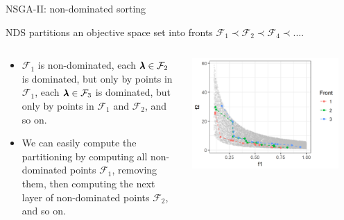 \begin{frame}[allowframebreaks]{NSGA-II: non-dominated sorting}



NDS partitions an objective space set into fronts $\mathcal{F}_1 \prec \mathcal{F}_2 \prec \mathcal{F}_4 \prec ... $.

\begin{columns}
\begin{column}{0.4\textwidth}
\begin{itemize}
    \item $\mathcal{F}_1$ is non-dominated, 
      each $\pmb{\lambda} \in \mathcal{F}_2$ is dominated, but only by points in $\mathcal{F}_1$, 
      each $\pmb{\lambda} \in \mathcal{F}_3$ is dominated, but only by points in $\mathcal{F}_1$ and $\mathcal{F}_2$, 
      and so on. 
    \item We can easily compute the partitioning by computing all non-dominated points  $\mathcal{F}_1$,
        removing them, then computing the next layer of non-dominated points $\mathcal{F_2}$, and so on.
\end{itemize}
\end{column}

\begin{column}{0.6\textwidth}
\begin{center}
\includegraphics[width = 0.9\textwidth]{images/NSGA2_NDS.png}
\end{center}
\end{column}
\end{columns}


\end{frame}
